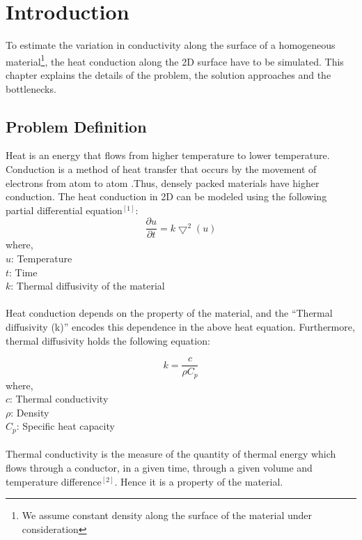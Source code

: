\documentclass[10pt,a4paper]{report}
\begin{document}
\tableofcontents
\thispagestyle{empty}


\chapter{Introduction}
To estimate the variation in conductivity along the surface of a homogeneous material\footnote{We assume constant density along the surface of the material under consideration}, the heat conduction along the 2D surface have to be simulated. This chapter explains the details of the problem, the solution approaches and the bottlenecks.\\




\section{Problem Definition}
Heat is an energy that flows from higher temperature to lower temperature. Conduction is a method of heat transfer that occurs by  the movement of electrons from atom to atom .Thus, densely packed materials have higher conduction. The heat conduction in 2D can be modeled using the following partial differential equation$^{[1]}$:
\begin{equation}
\frac{\partial u}{\partial t}=k \bigtriangledown^2(u)
\end{equation}
where,\\
$u$: Temperature\\
$t$: Time\\
$k$: Thermal diffusivity of the material\\
\\
Heat conduction depends on the property of the material, and the “Thermal diffusivity (k)” encodes this dependence in the above heat equation. Furthermore, thermal diffusivity holds the following equation: 

\begin{equation}
k=\frac{c}{\rho C_p}
\end{equation}
where,\\
$c$: Thermal conductivity\\
$\rho$: Density\\
$C_p$: Specific heat capacity\\
\\
Thermal conductivity is the measure of the quantity of thermal energy which flows through a conductor, in a given time, through a given volume and temperature difference$^{[2]}$. Hence it is a property of the material.
\end{document}
